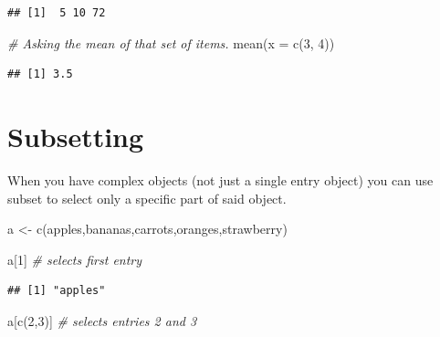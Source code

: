 \documentclass[
]{book}
\newenvironment{Shaded}{\begin{snugshade}}{\end{snugshade}}
\newcommand{\AttributeTok}[1]{\textcolor[rgb]{0.77,0.63,0.00}{#1}}
\newcommand{\CommentTok}[1]{\textcolor[rgb]{0.56,0.35,0.01}{\textit{#1}}}
\newcommand{\DecValTok}[1]{\textcolor[rgb]{0.00,0.00,0.81}{#1}}
\newcommand{\FunctionTok}[1]{\textcolor[rgb]{0.00,0.00,0.00}{#1}}
\newcommand{\NormalTok}[1]{#1}
\newcommand{\OtherTok}[1]{\textcolor[rgb]{0.56,0.35,0.01}{#1}}
\newcommand{\StringTok}[1]{\textcolor[rgb]{0.31,0.60,0.02}{#1}}
\begin{document}
\begin{verbatim}
## [1]  5 10 72
\end{verbatim}

\begin{Shaded}
\begin{Highlighting}[]
\CommentTok{\# Asking the mean of that set of items.}
\FunctionTok{mean}\NormalTok{(}\AttributeTok{x =} \FunctionTok{c}\NormalTok{(}\DecValTok{3}\NormalTok{, }\DecValTok{4}\NormalTok{))}
\end{Highlighting}
\end{Shaded}

\begin{verbatim}
## [1] 3.5
\end{verbatim}

\hypertarget{subsetting}{%
\section{Subsetting}\label{subsetting}}

When you have complex objects (not just a single entry object) you can use subset to select only a specific part of said object.

\begin{Shaded}
\begin{Highlighting}[]
\NormalTok{a }\OtherTok{\textless{}{-}} \FunctionTok{c}\NormalTok{(}\StringTok{\textquotesingle{}apples\textquotesingle{}}\NormalTok{,}\StringTok{\textquotesingle{}bananas\textquotesingle{}}\NormalTok{,}\StringTok{\textquotesingle{}carrots\textquotesingle{}}\NormalTok{,}\StringTok{\textquotesingle{}oranges\textquotesingle{}}\NormalTok{,}\StringTok{\textquotesingle{}strawberry\textquotesingle{}}\NormalTok{)}

\NormalTok{a[}\DecValTok{1}\NormalTok{]   }\CommentTok{\# selects first entry}
\end{Highlighting}
\end{Shaded}

\begin{verbatim}
## [1] "apples"
\end{verbatim}

\begin{Shaded}
\begin{Highlighting}[]
\NormalTok{a[}\FunctionTok{c}\NormalTok{(}\DecValTok{2}\NormalTok{,}\DecValTok{3}\NormalTok{)]  }\CommentTok{\# selects entries 2 and 3}
\end{Highlighting}
\end{Shaded}
\end{document}

